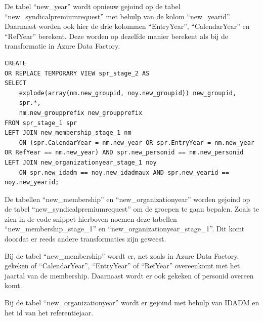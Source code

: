 De tabel ``new\_year'' wordt opnieuw gejoind op de tabel ``new\_syndicalpremiumrequest'' met behulp van de kolom ``new\_yearid''. Daarnaast worden ook hier de drie kolommen ``EntryYear'', ``CalendarYear'' en ``RefYear'' berekent. Deze worden op dezelfde manier berekent als bij de transformatie in Azure Data Factory.


\begin{verbatim}
CREATE
OR REPLACE TEMPORARY VIEW spr_stage_2 AS
SELECT 
    explode(array(nm.new_groupid, noy.new_groupid)) new_groupid,
    spr.*,
    nm.new_groupprefix new_groupprefix
FROM spr_stage_1 spr
LEFT JOIN new_membership_stage_1 nm 
    ON (spr.CalendarYear = nm.new_year OR spr.EntryYear = nm.new_year OR RefYear == nm.new_year) AND spr.new_personid == nm.new_personid 
LEFT JOIN new_organizationyear_stage_1 noy 
    ON spr.new_idadm == noy.new_idadmaux AND spr.new_yearid == noy.new_yearid;
\end{verbatim}

De tabellen ``new\_membership'' en ``new\_organizationyear'' worden gejoind op de tabel ``new\_syndicalpremiumrequest'' om de groepen te gaan bepalen. Zoals te zien in de code snippet hierboven noemen deze tabellen ``new\_membership\_stage\_1'' en ``new\_organizationyear\_stage\_1''. Dit komt doordat er reeds andere transformaties zijn geweest.

Bij de tabel ``new\_membership'' wordt er, net zoals in Azure Data Factory, gekeken of ``CalendarYear'', ``EntryYear'' of ``RefYear'' overeenkomt met het jaartal van de membership. Daarnaast wordt er ook gekeken of personid overeen komt. 

Bij de tabel ``new\_organizationyear'' wordt er gejoind met behulp van IDADM en het id van het referentiejaar.

